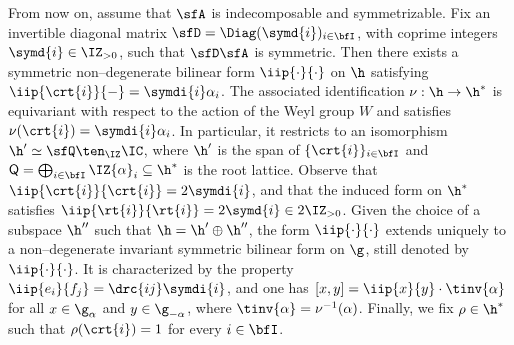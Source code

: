 \documentclass[reqno]{amsart}
\numberwithin{equation}{section}
\begin{document}
From now on, assume that $\sfA$ is indecomposable and symmetrizable. Fix an invertible diagonal matrix
$\sfD=\Diag(\symd{i})_{i\in\bfI}$, with coprime integers $\symd{i}\in\IZ_{>0}$, such that
$\sfD\sfA$ is symmetric. Then there exists a symmetric non--degenerate bilinear form
$\iip{\cdot}{\cdot}$ on $\h$ satisfying $\iip{\crt{i}}{-}=\symdi{i}\alpha_i$.
The associated identification $\nu:\h\to\h^*$ is equivariant with respect to the action of the Weyl group $W$ and satisfies
$\nu(\crt{i})=\symdi{i}\alpha_i$. In particular, it restricts to an isomorphism
$\h'\simeq\sfQ\ten_{\IZ}\IC$, where $\h'$ is the span of
$\{\crt{i}\}_{i\in\bfI}$ and ${\mathsf{Q}}=\bigoplus_{i\in\bfI}\IZ{\alpha}_i\subseteq\h^*$ is the root lattice.
Observe that $\iip{\crt{i}}{\crt{i}}=2\symdi{i}$, and that the induced form on $\h^*$ satisfies
$\iip{\rt{i}}{\rt{i}}=2\symd{i}\in 2\IZ_{>0}$. Given the choice of a subspace $\h''$ such that $\h=\h'\oplus\h''$, the form $\iip{\cdot}{\cdot}$ extends uniquely to a non--degenerate invariant
symmetric bilinear form on $\g$, still denoted by $\iip{\cdot}{\cdot}$. It is characterized by the property
$\iip{e_i}{f_j}=\drc{ij}\symdi{i}$, and one has
$[x,y]=\iip{x}{y}\cdot\tinv{\alpha}$ for all $x\in\g_{\alpha}$ and $y\in\g_{-\alpha}$, where
$\tinv{\alpha}=\nu^{-1}(\alpha)$. Finally, we fix $\rho\in\h^*$ such that $\rho(\crt{i})=1$ for every $i\in\bfI$.
\end{document}
